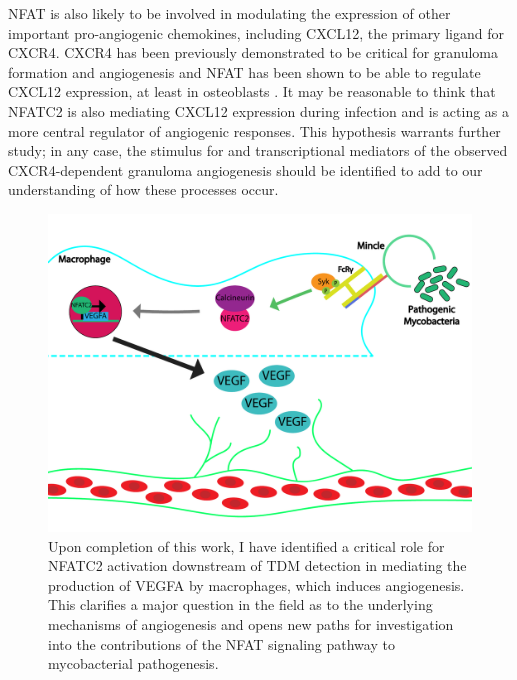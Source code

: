 NFAT is also likely to be involved in modulating the expression of other important pro\hyp{}angiogenic chemokines, including CXCL12, the primary ligand for CXCR4. CXCR4 has been previously demonstrated to be critical for granuloma formation and angiogenesis \citep{Torraca2017} and NFAT has been shown to be able to regulate CXCL12 expression, at least in osteoblasts \citep{Sesler2013}. It may be reasonable to think that NFATC2 is also mediating CXCL12 expression during infection and is acting as a more central regulator of angiogenic responses. This hypothesis warrants further study; in any case, the stimulus for and transcriptional mediators of the observed CXCR4\hyp{}dependent granuloma angiogenesis should be identified to add to our understanding of how these processes occur.

\begin{figure}
\centering
\includegraphics[width=\textwidth]{images/conclusion_schematic.pdf}
\caption[Summary figure]{Upon completion of this work, I have identified a critical role for NFATC2 activation downstream of TDM detection in mediating the production of VEGFA by macrophages, which induces angiogenesis. This clarifies a major question in the field as to the underlying mechanisms of angiogenesis and opens new paths for investigation into the contributions of the NFAT signaling pathway to mycobacterial pathogenesis.}
\label{figure:endschematic}
\end{figure}


